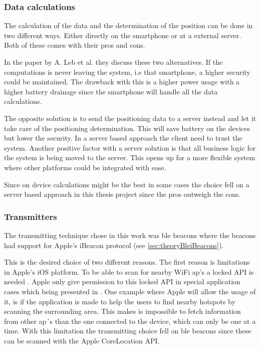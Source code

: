 \subsubsection{Data calculations}\label{sec:methodSoftwareDesignData}
The calculation of the data and the determination of the position can be done in two different ways.
Either directly on the smartphone or at a external server. 
Both of these comes with their pros and cons.

\bigskip

In the paper \cite{DevelopmentSmartphoneBasedUniversity2021} by A. Leb et al. they discuss these two alternatives.
If the computations is never leaving the system, i.e that smartphone, a higher security could be maintained. 
The drawback with this is a higher power usage with a higher battery drainage since the smartphone will handle all the data calculations.

\bigskip

The opposite solution is to send the positioning data to a server instead and let it take care of the positioning determination.
This will save battery on the devices but lower the security. 
In a server based approach the client need to trust the system.
Another positive factor with a server solution is that all business logic for the system is being moved to the server.
This opens up for a more flexible system where other platforms could be integrated with ease.

\bigskip

Since on device calculations might be the best in some cases the choice fell on a server based approach in this thesis project since the pros outweigh the cons.


\subsubsection{Transmitters}\label{sec:methodSoftwareDesignTransmitters}
The transmitting technique chose in this work was \acrshort{ble} beacons where the beacons had support for Apple's iBeacon protocol (see \cref{sec:theoryBleiBeacons}).

\bigskip

This is the desired choice of two different reasons.
The first reason is limitations in Apple's iOS platform.
To be able to scan for nearby WiFi \acrshort{ap}'s a locked API is needed \cite{NEHotspotHelperAppleDeveloper}.
Apple only give permission to this locked API in special application cases which being presented in \cite{TechnicalQA1942IOS}.
One example where Apple will allow the usage of it, is if the application is made to help the users to find nearby hotspots by scanning the surrounding area.
This makes is impossible to fetch information from other \acrshort{ap}´s than the one connected to the device, which can only be one at a time.
With this limitation the transmitting choice fell on \acrshort{ble} beacons since these can be scanned with the Apple CoreLocation API.

